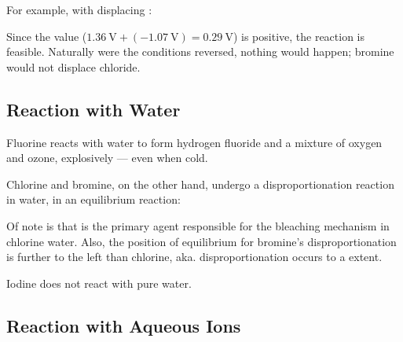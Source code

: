 			For example, with  displacing :


			Since the \Ecell{} value ($\SI{1.36}{\volt} + (\SI{-1.07}{\volt}) = \SI{+0.29}{\volt}$) is positive, the reaction is feasible.
			Naturally were the conditions reversed, nothing would happen; bromine would not displace chloride.





		\subsection{Reaction with Water}

			Fluorine reacts with water to form hydrogen fluoride and a mixture of oxygen and ozone, explosively --- even when cold.



			Chlorine and bromine, on the other hand, undergo a disproportionation reaction in water, in an equilibrium reaction:


			Of note is that  is the primary agent responsible for the bleaching mechanism in chlorine water. Also, the position
			of equilibrium for bromine's disproportionation is further to the left than chlorine, aka. disproportionation occurs to
			a  extent.


			Iodine does not react with pure water.



		\subsection{Reaction with Aqueous \texorpdfstring{}{Fe²⁺} Ions}

